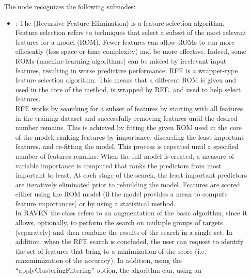 \begin{itemize}
      The  node recognizes the following subnodes:
      \begin{itemize}
        \item {}:
          The  (Recursive Feature Elimination) is a feature selection algorithm.
          Feature selection refers to techniques that select a subset of the most relevant features
          for a model (ROM).         Fewer features can allow ROMs to run more efficiently (less
          space or time complexity) and be more effective.         Indeed, some ROMs (machine
          learning algorithms) can be misled by irrelevant input features, resulting in worse
          predictive performance.         RFE is a wrapper-type feature selection algorithm. This
          means that a different ROM is given and used in the core of the         method,         is
          wrapped by RFE, and used to help select features.         \\RFE works by searching for a
          subset of features by starting with all features in the training dataset and successfully
          removing         features until the desired number remains.         This is achieved by
          fitting the given ROM used in the core of the model, ranking features by importance,
          discarding the least important features, and re-fitting the model. This process is
          repeated until a specified number of         features remains.         When the full model
          is created, a measure of variable importance is computed that ranks the predictors from
          most         important to least.         At each stage of the search, the least important
          predictors are iteratively eliminated prior to rebuilding the model.         Features are
          scored either using the ROM model (if the model provides a mean to compute feature
          importances) or by         using a statistical method.         \\In RAVEN the
           class refers to an augmentation of the basic algorithm, since it allows,
          optionally,         to perform the search on multiple groups of targets (separately) and
          then combine the results of the search in a         single set. In addition, when the RFE
          search is concluded, the user can request to identify the set of features         that
          bring to a minimization of the score (i.e. maximimization of the accuracy).         In
          addition, using the ``applyClusteringFiltering'' option, the algorithm can, using an

\end{itemize}
\end{itemize}

